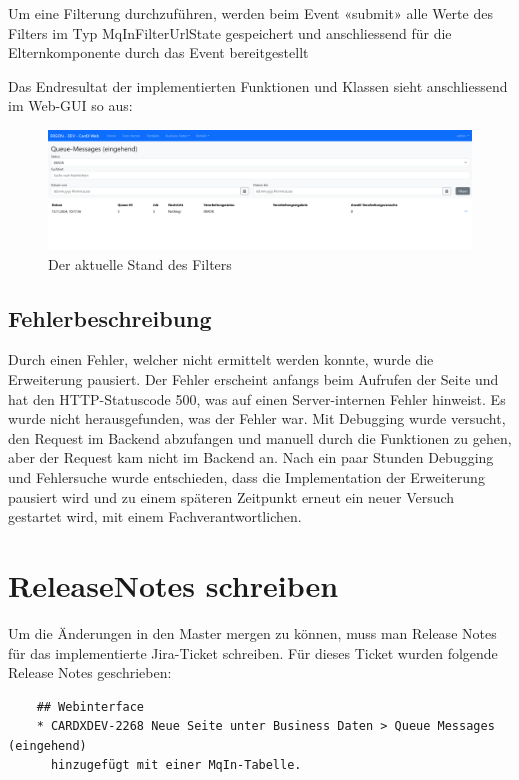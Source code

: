 Um eine Filterung durchzuführen, werden beim Event «submit» alle Werte des Filters im Typ MqInFilterUrlState gespeichert und anschliessend für die Elternkomponente durch das Event bereitgestellt

Das Endresultat der implementierten Funktionen und Klassen sieht anschliessend im Web-GUI so aus:

\begin{figure}[H]
	\begin{center}
		\includegraphics[width=1\textwidth]{ressourcen/Filterung}
		\caption[Der aktuelle Stand des Filters]{Der aktuelle Stand des Filters}\label{fig:filtering-v1}
	\end{center}
\end{figure}

\subsection{Fehlerbeschreibung}
Durch einen Fehler, welcher nicht ermittelt werden konnte, wurde die Erweiterung pausiert. Der Fehler erscheint anfangs beim Aufrufen der Seite und hat den HTTP-Statuscode 500, was auf einen Server-internen Fehler hinweist. Es wurde nicht herausgefunden, was der Fehler war. Mit Debugging wurde versucht, den Request im Backend abzufangen und manuell durch die Funktionen zu gehen, aber der Request kam nicht im Backend an. Nach ein paar Stunden Debugging und Fehlersuche wurde entschieden, dass die Implementation der Erweiterung pausiert wird und zu einem späteren Zeitpunkt erneut ein neuer Versuch gestartet wird, mit einem Fachverantwortlichen.

\section{ReleaseNotes schreiben}
Um die Änderungen in den Master mergen zu können, muss man Release Notes für das implementierte Jira-Ticket schreiben. Für dieses Ticket wurden folgende Release Notes geschrieben:

\begin{verbatim}
	## Webinterface
	* CARDXDEV-2268 Neue Seite unter Business Daten > Queue Messages (eingehend)
	  hinzugefügt mit einer MqIn-Tabelle.
\end{verbatim}
\newpage